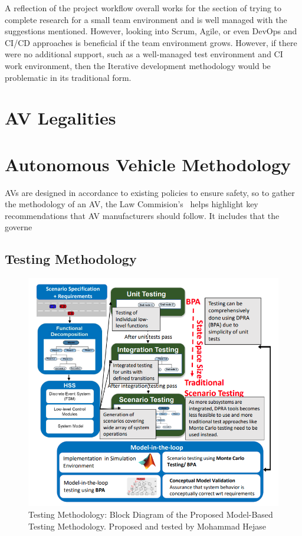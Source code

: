 \documentclass[12pt]{report} %
\begin{document}
		A reflection of the project workflow overall works for the section of trying to complete research for a small team environment and is well managed with the suggestions mentioned. However, looking into Scrum, Agile, or even DevOps and CI/CD approaches is beneficial if the team environment grows. However, if there were no additional support, such as a well-managed test environment and CI work environment, then the Iterative development methodology would be problematic in its traditional form.

\chapter{AV Legalities}
\label{chap:legalConcerns}
	
			

\chapter{Autonomous Vehicle Methodology}
\label{chap:autonomousVehicleMethodology}
	AVs are designed in accordance to existing policies to ensure safety, so to gather the methodology of an AV, the Law Commision's~\cite{noauthor_automated_nodate} helps highlight key recommendations that AV manufacturers should follow. It includes that the governe

	\section{Testing Methodology}
		\begin{figure}[ht]
			\centering
			\includegraphics[width=.60\columnwidth]{Figures/literature_review/Research/Testing_Methodology.png}
			\caption{Testing Methodology: Block Diagram of the Proposed Model-Based Testing
			Methodology. Proposed and tested by Mohammad Hejase~\cite{hejase_methodology_2020}}
			\label{fig:avmTestingMethodology}
		\end{figure}
\end{document}
